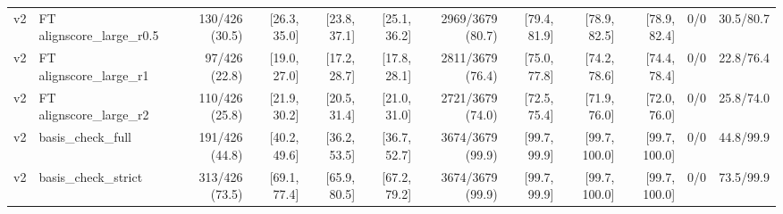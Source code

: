\begin{table}[t]
{\begin{tabular}{llrrrrrrrrrr}
v2 & FT alignscore\_large\_r0.5 & 130/426 (30.5) & [26.3, 35.0] & [23.8, 37.1] & [25.1, 36.2] & 2969/3679 (80.7) & [79.4, 81.9] & [78.9, 82.5] & [78.9, 82.4] & 0/0 & 30.5/80.7 \\
v2 & FT alignscore\_large\_r1 & 97/426 (22.8) & [19.0, 27.0] & [17.2, 28.7] & [17.8, 28.1] & 2811/3679 (76.4) & [75.0, 77.8] & [74.2, 78.6] & [74.4, 78.4] & 0/0 & 22.8/76.4 \\
v2 & FT alignscore\_large\_r2 & 110/426 (25.8) & [21.9, 30.2] & [20.5, 31.4] & [21.0, 31.0] & 2721/3679 (74.0) & [72.5, 75.4] & [71.9, 76.0] & [72.0, 76.0] & 0/0 & 25.8/74.0 \\
v2 & basis\_check\_full & 191/426 (44.8) & [40.2, 49.6] & [36.2, 53.5] & [36.7, 52.7] & 3674/3679 (99.9) & [99.7, 99.9] & [99.7, 100.0] & [99.7, 100.0] & 0/0 & 44.8/99.9 \\
v2 & basis\_check\_strict & 313/426 (73.5) & [69.1, 77.4] & [65.9, 80.5] & [67.2, 79.2] & 3674/3679 (99.9) & [99.7, 99.9] & [99.7, 100.0] & [99.7, 100.0] & 0/0 & 73.5/99.9 \\
\bottomrule
\end{tabular}}
\end{table}
